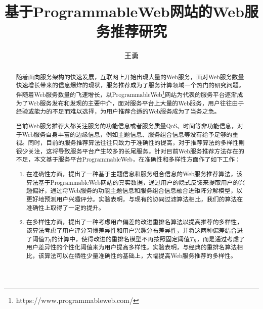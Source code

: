 \documentclass[master,winfonts]{njuthesis}
\title{基于ProgrammableWeb网站的Web服务推荐研究}
\author{王勇}
\institute{南京大学}
\begin{document}
\maketitle
\makeenglishtitle


\frontmatter

\begin{abstract}
随着面向服务架构的快速发展，互联网上开始出现大量的Web服务，面对Web服务数量快速增长带来的信息爆炸的现状，服务推荐成为了服务计算领域一个热门的研究问题。伴随着Web服务数量的飞速增长，以ProgrammableWeb\footnote{https://www.programmableweb.com/}网站为代表的服务平台逐渐成为了Web服务发布和发现的主要中介，面对服务平台上大量的Web服务，用户往往由于经验或能力的不足而难以选择，为用户推荐合适的Web服务成为了当务之急。

当前Web服务推荐大都关注服务的功能信息或者服务质量QoS、时间等非功能信息，对于Web服务自身丰富的边缘信息，例如主题信息、服务组合信息等没有给予足够的重视。同时，目前的服务推荐算法往往只致力于准确性的提高，对于推荐算法的多样性则很少关注，这将导致服务平台产生较多的长尾服务。针对目前Web服务推荐方法存在的不足，本文基于服务平台ProgrammableWeb，在准确性和多样性方面作了如下工作：

\begin{enumerate}
\item 在准确性方面，提出了一种基于主题信息和服务组合信息的Web服务推荐算法，该算法基于ProgrammableWeb网站的真实数据，通过用户的隐式反馈来提取用户的兴趣偏好，通过将Web服务的功能主题信息和服务组合信息融合进矩阵分解模型，以更好地预测用户兴趣评分。实验表明，与现有的协同过滤算法相比，我们的算法在准确性上取得了一定的提升。

\item 在多样性方面，提出了一种考虑用户偏差的改进重排名算法以提高推荐的多样性，该算法考虑了用户评分习惯差异性和用户兴趣分布差异性，并将这两种偏差结合进了阈值$T_R$的计算中，使得改进的重排名模型不再按照固定阈值$T_R$，而是通过考虑了用户差异性的个性化阈值来为用户提高多样性。实验表明，与经典的重排名算法相比，该算法可以在牺牲少量准确性的基础上，大幅提高Web服务推荐的多样性。
\end{enumerate}

\end{abstract}
\end{document}

